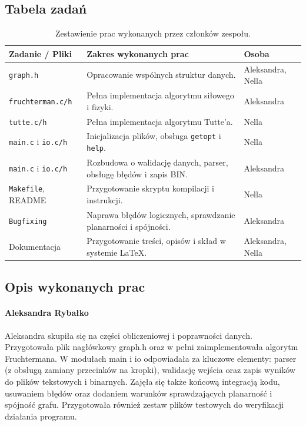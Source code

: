 \documentclass[12pt,a4paper]{article}
\begin{document}
\subsection{Tabela zadań}
\begin{table}[h]
    \centering
    \small
    \begin{tabularx}{\textwidth}{@{} l X l @{}}
        \toprule
        \textbf{Zadanie / Pliki} & \textbf{Zakres wykonanych prac} & \textbf{Osoba} \\
        \midrule
        \texttt{graph.h} & Opracowanie wspólnych struktur danych. & Aleksandra, Nella \\
        \texttt{fruchterman.c/h} & Pełna implementacja algorytmu siłowego i fizyki. & Aleksandra \\
        \texttt{tutte.c/h} & Pełna implementacja algorytmu Tutte'a. & Nella \\
        \texttt{main.c} i \texttt{io.c/h} & Inicjalizacja plików, obsługa \texttt{getopt} i \texttt{help}. & Nella \\
        \texttt{main.c} i \texttt{io.c/h} & Rozbudowa o walidację danych, parser, obsługę błędów i zapis BIN. & Aleksandra \\
        \texttt{Makefile}, README & Przygotowanie skryptu kompilacji i instrukcji. & Nella \\
        \texttt{Bugfixing} & Naprawa błędów logicznych, sprawdzanie planarności i spójności. & Aleksandra \\
        Dokumentacja & Przygotowanie treści, opisów i skład w systemie LaTeX. & Aleksandra, Nella \\
        \bottomrule
    \end{tabularx}
    \caption{Zestawienie prac wykonanych przez członków zespołu.}
\end{table}

\subsection{Opis wykonanych prac}

\paragraph{Aleksandra Rybałko}
Aleksandra skupiła się na części obliczeniowej i poprawności danych. Przygotowała plik nagłówkowy graph.h oraz w pełni zaimplementowała algorytm Fruchtermana. W modułach main i io odpowiadała za kluczowe elementy: parser (z obsługą zamiany przecinków na kropki), walidację wejścia oraz zapis wyników do plików tekstowych i binarnych. Zajęła się także końcową integracją kodu, usuwaniem błędów oraz dodaniem warunków sprawdzających planarność i spójność grafu. Przygotowała również zestaw plików testowych do weryfikacji działania programu.
\end{document}
